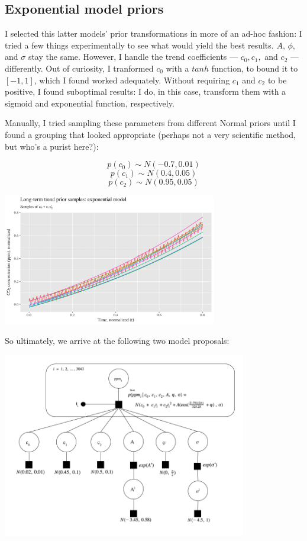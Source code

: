 \documentclass[]{article}
\let\origfigure=\figure
\let\endorigfigure=\endfigure
\renewenvironment{figure}[1][]{%
  \origfigure[H]
}{%
  \endorigfigure
}
\begin{document}
\hypertarget{exponential-model-priors}{%
\subsection{Exponential model priors}\label{exponential-model-priors}}

I selected this latter models' prior transformations in more of an
ad-hoc fashion: I tried a few things experimentally to see what would
yield the best results. \(A\), \(\phi\), and \(\sigma\) stay the same.
However, I handle the trend coefficients --- \(c_0, c_1,\) and \(c_2\)
--- differently. Out of curiosity, I tranformed \(c_0\) with a \(tanh\)
function, to bound it to \([-1, 1]\), which I found worked adequately.
Without requiring \(c_1\) and \(c_2\) to be positive, I found suboptimal
results: I do, in this case, transform them with a sigmoid and
exponential function, respectively.\newline

Manually, I tried sampling these parameters from different Normal priors
until I found a grouping that looked appropriate (perhaps not a very
scientific method, but who's a purist here?):

\[p(c_0) \sim N(-0.7, 0.01)\] \[p(c_1) \sim N(0.4, 0.05)\]
\[p(c_2) \sim N(0.95, 0.05)\]

\begin{figure}
\centering
\includegraphics[width=0.7\textwidth]{mauna_loa/exp_prior_samples.png}
\caption{Exponential model prior samples}
\end{figure}

So ultimately, we arrive at the following two model proposals:

\begin{figure}
\centering
\includegraphics[width=0.8\textwidth]{mauna_loa/quadratic_graph.png}
\caption{Quadratic likelihood graphical model.}
\end{figure}
\end{document}
